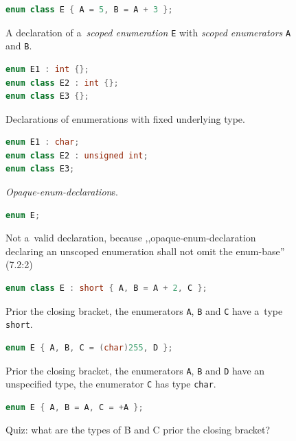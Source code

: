 \documentclass{fithesis3}
\begin{document}
\begin{figure}
\begin{lstlisting}[language=C++]
enum class E { A = 5, B = A + 3 };
\end{lstlisting}
\caption{A declaration of a~\textit{scoped enumeration} \texttt{E} with \textit{scoped enumerators} \texttt{A} and \texttt{B}.}
\end{figure}

\begin{figure}
\begin{lstlisting}[language=C++]
enum E1 : int {};
enum class E2 : int {};
enum class E3 {};
\end{lstlisting}
\caption{Declarations of enumerations with fixed underlying type.}
\end{figure}

\begin{figure}
\begin{lstlisting}[language=C++]
enum E1 : char;
enum class E2 : unsigned int;
enum class E3;
\end{lstlisting}
\caption{\textit{Opaque-enum-declaration}s.}
\end{figure}

\begin{figure}
\begin{lstlisting}[language=C++]
enum E;
\end{lstlisting}
\caption{Not a~valid declaration, because ,,opaque-enum-declaration declaring an unscoped enumeration shall not omit the enum-base'' (7.2:2)}
\end{figure}

\begin{figure}
\begin{lstlisting}[language=C++]
enum class E : short { A, B = A + 2, C };
\end{lstlisting}
\caption{Prior the closing bracket, the enumerators \texttt{A}, \texttt{B} and \texttt{C} have a~type \texttt{short}.}
\end{figure}

\begin{figure}
\begin{lstlisting}[language=C++]
enum E { A, B, C = (char)255, D };
\end{lstlisting}
\caption{Prior the closing bracket, the enumerators \texttt{A}, \texttt{B} and \texttt{D} have an unspecified type, the enumerator \texttt{C} has type \texttt{char}.}
\end{figure}

\begin{figure}
\begin{lstlisting}[language=C++]
enum E { A, B = A, C = +A };
\end{lstlisting}
\caption{Quiz: what are the types of B and C prior the closing bracket?}
\end{figure}
\end{document}
